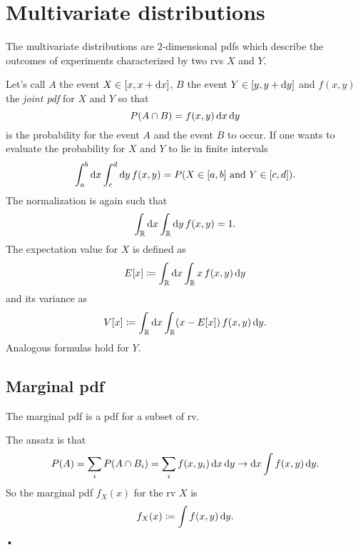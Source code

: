\section{Multivariate distributions}

The multivariate distributions are $2$-dimensional \acp{pdf} which describe the outcomes of experiments characterized by two \acp{rv} $X$ and $Y$.

Let's call $A$ the event $X\in[x,x + \mathop{}\!\mathrm{d} x]$, $B$ the event $Y \in [y,y+\mathop{}\!\mathrm{d} y]$ and $f(x,y)$ the \emph{joint \ac{pdf}} for $X$ and $Y$ so that
\begin{equation}
	P(A\cap B) = f(x,y)\mathop{}\!\mathrm{d} x\mathop{}\!\mathrm{d} y
\end{equation}
is the probability for the event $A$ and the event $B$ to occur.
If one wants to evaluate the probability for $X$ and $Y$ to lie in finite intervals
\begin{equation}
	\int_a^b\mathop{}\!\mathrm{d} x\int_c^d\mathop{}\!\mathrm{d} y\,f(x,y) = P(X\in[a,b]\text{ and }Y \in [c,d]).
\end{equation}
The normalization is again such that
\begin{equation}
	\int_{\mathbb{R}}\mathop{}\!\mathrm{d} x\int_{\mathbb{R}}\mathop{}\!\mathrm{d} y\,f(x,y) = 1.
\end{equation}
The expectation value for $X$ is defined as
\begin{equation}
	E[x] \coloneqq \int_{\mathbb{R}}\mathop{}\!\mathrm{d} x\int_{\mathbb{R}} x\,f(x,y)\mathop{}\!\mathrm{d} y
\end{equation}
and its variance as
\begin{equation}
	V[x]\coloneqq \int_{\mathbb{R}}\mathop{}\!\mathrm{d} x\int_{\mathbb{R}} (x-E[x])\,f(x,y)\mathop{}\!\mathrm{d} y.
\end{equation}
Analogous formulas hold for $Y$.

\subsection{Marginal \acs{pdf}}

The marginal \ac{pdf} is a \ac{pdf} for a  subset of \acs{rv}.


The ansatz is that
\begin{equation}
	P(A) = \sum_i P(A\cap B_i)
	= \sum_i f(x,y_i) \mathop{}\!\mathrm{d} x \mathop{}\!\mathrm{d} y\to
	\mathop{}\!\mathrm{d} x\int f(x,y)\mathop{}\!\mathrm{d} y.
\end{equation}
So the marginal \ac{pdf} $f_X(x)$ for the \ac{rv} $X$ is
\begin{equation}
	f_X(x) \coloneqq \int f(x,y)\mathop{}\!\mathrm{d} y.
\end{equation}•

